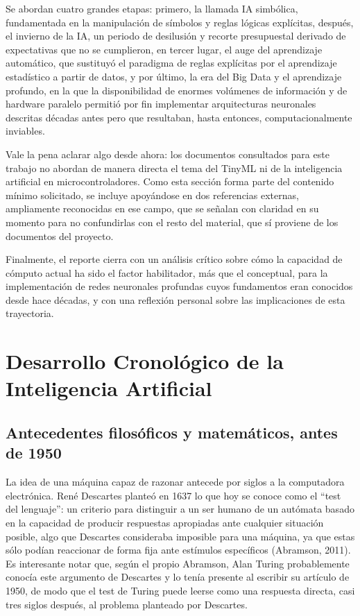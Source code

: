 \documentclass[12pt,letterpaper]{article}
\begin{document}
Se abordan cuatro grandes etapas: primero, la llamada IA simb\'olica, fundamentada en la manipulaci\'on de s\'imbolos y reglas l\'ogicas expl\'icitas, despu\'es, el invierno de la IA, un periodo de desilusi\'on y recorte presupuestal derivado de expectativas que no se cumplieron, en tercer lugar, el auge del aprendizaje autom\'atico, que sustituy\'o el paradigma de reglas expl\'icitas por el aprendizaje estad\'istico a partir de datos, y por \'ultimo, la era del Big Data y el aprendizaje profundo, en la que la disponibilidad de enormes vol\'umenes de informaci\'on y de hardware paralelo permiti\'o por fin implementar arquitecturas neuronales descritas d\'ecadas antes pero que resultaban, hasta entonces, computacionalmente inviables.

Vale la pena aclarar algo desde ahora: los documentos consultados para este trabajo no abordan de manera directa el tema del TinyML ni de la inteligencia artificial en microcontroladores. Como esta secci\'on forma parte del contenido m\'inimo solicitado, se incluye apoy\'andose en dos referencias externas, ampliamente reconocidas en ese campo, que se se\~nalan con claridad en su momento para no confundirlas con el resto del material, que s\'i proviene de los documentos del proyecto.

Finalmente, el reporte cierra con un an\'alisis cr\'itico sobre c\'omo la capacidad de c\'omputo actual ha sido el factor habilitador, m\'as que el conceptual, para la implementaci\'on de redes neuronales profundas cuyos fundamentos eran conocidos desde hace d\'ecadas, y con una reflexi\'on personal sobre las implicaciones de esta trayectoria.

\section{Desarrollo Cronol\'ogico de la Inteligencia Artificial}

\subsection{Antecedentes filos\'oficos y matem\'aticos, antes de 1950}

La idea de una m\'aquina capaz de razonar antecede por siglos a la computadora electr\'onica. Ren\'e Descartes plante\'o en 1637 lo que hoy se conoce como el ``test del lenguaje'': un criterio para distinguir a un ser humano de un aut\'omata basado en la capacidad de producir respuestas apropiadas ante cualquier situaci\'on posible, algo que Descartes consideraba imposible para una m\'aquina, ya que estas s\'olo pod\'ian reaccionar de forma fija ante est\'imulos espec\'ificos (Abramson, 2011). Es interesante notar que, seg\'un el propio Abramson, Alan Turing probablemente conoc\'ia este argumento de Descartes y lo ten\'ia presente al escribir su art\'iculo de 1950, de modo que el test de Turing puede leerse como una respuesta directa, casi tres siglos despu\'es, al problema planteado por Descartes.
\end{document}
